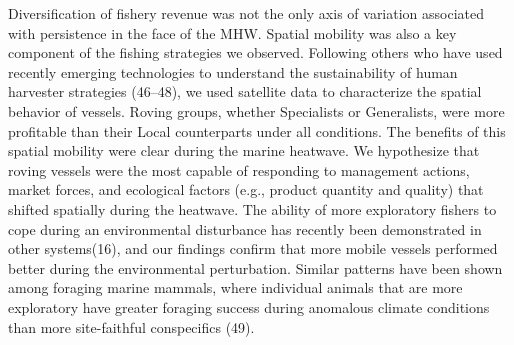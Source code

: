 \documentclass[9pt,twocolumn,twoside,lineno]{pnas-new}
\begin{document}
Diversification of fishery revenue was not the only axis of variation
associated with persistence in the face of the MHW. Spatial mobility was
also a key component of the fishing strategies we observed. Following
others who have used recently emerging technologies to understand the
sustainability of human harvester strategies (46--48), we used satellite
data to characterize the spatial behavior of vessels. Roving groups,
whether Specialists or Generalists, were more profitable than their
Local counterparts under all conditions. The benefits of this spatial
mobility were clear during the marine heatwave. We hypothesize that
roving vessels were the most capable of responding to management
actions, market forces, and ecological factors (e.g., product quantity
and quality) that shifted spatially during the heatwave. The ability of
more exploratory fishers to cope during an environmental disturbance has
recently been demonstrated in other systems(16), and our findings
confirm that more mobile vessels performed better during the
environmental perturbation. Similar patterns have been shown among
foraging marine mammals, where individual animals that are more
exploratory have greater foraging success during anomalous climate
conditions than more site-faithful conspecifics (49).
\end{document}
